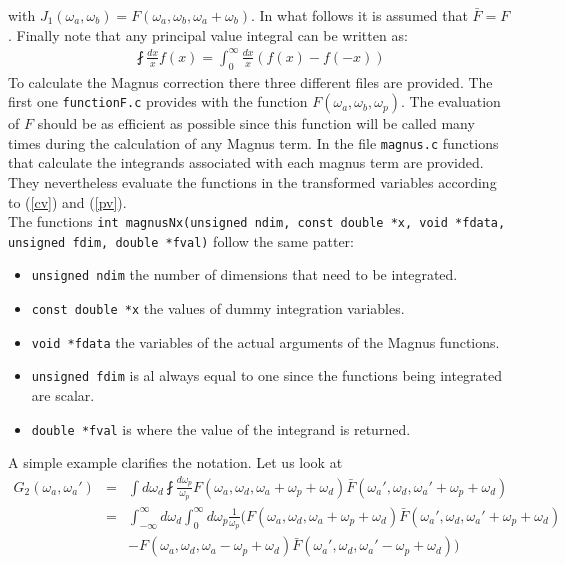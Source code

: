 \documentclass[10pt,letterpaper]{article}
\begin{document}
with $J_1(\omega_a,\omega_b)=F(\omega_a,\omega_b,\omega_a+\omega_b)$. In what follows it is assumed that $\bar F =F$.
Finally note that any principal value integral can be written as:
\begin{eqnarray}\label{pv}
\fint \frac{dx}{x} f(x)= \int_0^{\infty} \frac{dx}{x} (f(x)-f(-x))
\end{eqnarray}
To calculate the Magnus correction there three different files are provided. The first one \verb|functionF.c| provides with the function $F(\omega_a,\omega_b,\omega_p)$. The evaluation of $F$ should be as efficient as possible since this function will be called many times during the calculation of any Magnus term. In the file \verb|magnus.c| functions that calculate the integrands associated with each magnus term are provided. They nevertheless evaluate the functions in the transformed variables according to (\ref{cv}) and (\ref{pv}). \\ The functions
\verb|int magnusNx(unsigned ndim, const double *x, void *fdata, unsigned fdim, double *fval)| follow the same patter:
\begin{itemize}
\item \verb|unsigned ndim| the number of dimensions that need to be integrated.
\item \verb|const double *x| the values of dummy integration variables.
\item \verb|void *fdata| the variables of the actual arguments of the Magnus functions.
\item \verb|unsigned fdim| is al always equal to one since the functions being integrated are scalar.
\item \verb|double *fval| is where the value of the integrand is returned.
\end{itemize}
A simple example clarifies the notation. Let us look at 
\begin{eqnarray}
G_2(\omega_a,\omega_a') &=&  \int   d\omega_{d} \fint  \frac{d\omega_p}{\omega_p} F\left(\omega_a,\omega _d,\omega _a+\omega _p+ \omega _d \right) \bar{F}\left(\omega _a',\omega _d,\omega _a'+\omega _p+\omega _d\right) \\
&=&\int_{-\infty}^{\infty}   d\omega_{d} \int_0^{\infty}  d\omega_p \frac{1}{\omega_p} \Big( F\left(\omega_a,\omega _d,\omega _a+\omega _p+ \omega _d \right) \bar{F}\left(\omega _a',\omega _d,\omega _a'+\omega _p+\omega _d\right)\\
&& -
F\left(\omega_a,\omega _d,\omega _a-\omega _p+ \omega _d \right) \bar{F}\left(\omega _a',\omega _d,\omega _a'-\omega _p+\omega _d\right) \Big) \nonumber
\end{eqnarray}
\end{document}
